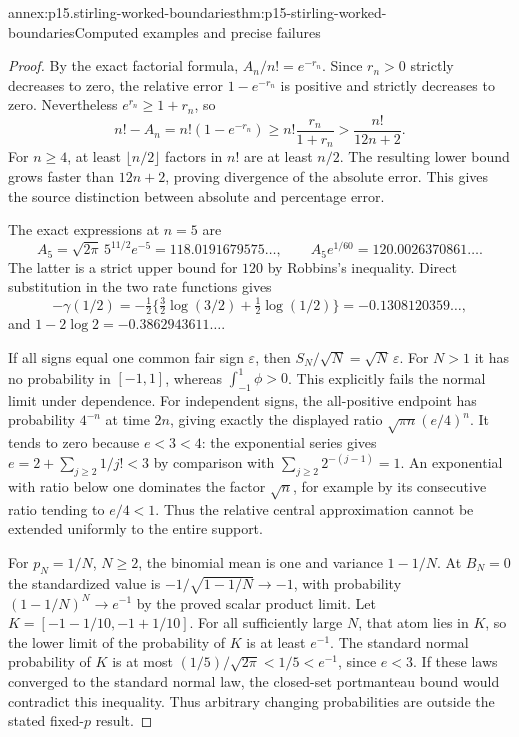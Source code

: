 \begin{annexitem}{annex:p15.stirling-worked-boundaries}{thm:p15-stirling-worked-boundaries}{Computed examples and precise failures}
\begin{proof}
By the exact factorial formula, \(A_n/n!=e^{-r_n}\).
Since \(r_n>0\) strictly decreases to zero, the relative
error \(1-e^{-r_n}\) is positive and strictly decreases
to zero. Nevertheless \(e^{r_n}\geq1+r_n\), so
\[
 n!-A_n=n!(1-e^{-r_n})
       \geq n!\frac{r_n}{1+r_n}
       >\frac{n!}{12n+2}.
\]
For \(n\geq4\), at least \(\lfloor n/2\rfloor\) factors
in \(n!\) are at least \(n/2\). The resulting lower
bound grows faster than \(12n+2\), proving divergence
of the absolute error. This gives the source distinction
between absolute and percentage error.

The exact expressions at \(n=5\) are
\[
 A_5=\sqrt{2\pi}\,5^{11/2}e^{-5}
       =118.0191679575\ldots,\qquad
 A_5e^{1/60}=120.0026370861\ldots.
\]
The latter is a strict upper bound for \(120\) by
Robbins's inequality. Direct substitution in the two
rate functions gives
\[
 -\gamma(1/2)
 =-\tfrac12\{\tfrac32\log(3/2)+\tfrac12\log(1/2)\}
 =-0.1308120359\ldots,
\]
and \(1-2\log2=-0.3862943611\ldots\).

If all signs equal one common fair sign \(\varepsilon\),
then \(S_N/\sqrt N=\sqrt N\,\varepsilon\).
For \(N>1\) it has no probability in \([-1,1]\),
whereas \(\int_{-1}^1\phi>0\).
This explicitly fails the normal limit under dependence.
For independent signs, the all-positive endpoint has
probability \(4^{-n}\) at time \(2n\), giving exactly
the displayed ratio \(\sqrt{\pi n}(e/4)^n\).
It tends to zero because \(e<3<4\): the exponential
series gives \(e=2+\sum_{j\geq2}1/j!<3\) by comparison
with \(\sum_{j\geq2}2^{-(j-1)}=1\).
An exponential with ratio below one dominates the
factor \(\sqrt n\), for example by its consecutive
ratio tending to \(e/4<1\).
Thus the relative central approximation cannot be
extended uniformly to the entire support.

For \(p_N=1/N\), \(N\geq2\), the binomial mean is one
and variance \(1-1/N\). At \(B_N=0\) the standardized
value is \(-1/\sqrt{1-1/N}\to-1\), with probability
\((1-1/N)^N\to e^{-1}\) by the proved scalar product
limit. Let \(K=[-1-1/10,-1+1/10]\).
For all sufficiently large \(N\), that atom lies in \(K\),
so the lower limit of the probability of \(K\) is at
least \(e^{-1}\).
The standard normal probability of \(K\) is at most
\((1/5)/\sqrt{2\pi}<1/5<e^{-1}\), since \(e<3\).
If these laws converged to the standard normal law,
the closed-set portmanteau bound would contradict
this inequality. Thus arbitrary changing probabilities
are outside the stated fixed-\(p\) result.
\end{proof}
\end{annexitem}
